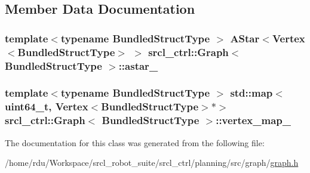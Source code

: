 \subsection{Member Data Documentation}
\hypertarget{classsrcl__ctrl_1_1Graph_a854e80856a38633186bca104eafe209b}{
\subsubsection[{astar\-\_\-}]{\setlength{\rightskip}{0pt plus 5cm}template$<$typename Bundled\-Struct\-Type $>$ {\bf A\-Star}$<${\bf Vertex}$<$Bundled\-Struct\-Type$>$ $>$ {\bf srcl\-\_\-ctrl\-::\-Graph}$<$ Bundled\-Struct\-Type $>$\-::astar\-\_\-\hspace{0.3cm}{\ttfamily [private]}}}\label{classsrcl__ctrl_1_1Graph_a854e80856a38633186bca104eafe209b}
\hypertarget{classsrcl__ctrl_1_1Graph_acbd662b725ae169caef9d70b36b74dd1}{
\subsubsection[{vertex\-\_\-map\-\_\-}]{\setlength{\rightskip}{0pt plus 5cm}template$<$typename Bundled\-Struct\-Type $>$ std\-::map$<$uint64\-\_\-t, {\bf Vertex}$<$Bundled\-Struct\-Type$>$$\ast$$>$ {\bf srcl\-\_\-ctrl\-::\-Graph}$<$ Bundled\-Struct\-Type $>$\-::vertex\-\_\-map\-\_\-\hspace{0.3cm}{\ttfamily [private]}}}\label{classsrcl__ctrl_1_1Graph_acbd662b725ae169caef9d70b36b74dd1}


The documentation for this class was generated from the following file\-:\begin{DoxyCompactItemize}
\item 
/home/rdu/\-Workspace/srcl\-\_\-robot\-\_\-suite/srcl\-\_\-ctrl/planning/src/graph/\hyperlink{graph_8h}{graph.\-h}\end{DoxyCompactItemize}
